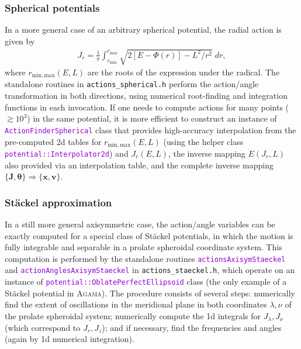 \documentclass[12pt]{article}
\newcommand{\Agama}{\textsc{Agama}\xspace}
\newcommand{\ttt}[1]{\textcolor{darkviolet}{\texttt{#1}}}
\newcommand{\bv}{\boldsymbol{v}}
\newcommand{\bx}{\boldsymbol{x}}
\newcommand{\bJ}{\boldsymbol{J}}
\newcommand{\bt}{\boldsymbol{\theta}}
\begin{document}
\subsubsection{Spherical potentials}  \label{sec:ActionsSpherical}

In a more general case of an arbitrary spherical potential, the radial action is given by 
\begin{align*}
J_r = \frac{1}{\pi} \int_{r_\mathrm{min}}^{r_\mathrm{max}} \sqrt{2[E-\Phi(r)] - L^2/r^2}\;dr,
\end{align*}
where $r_\mathrm{min,max}(E,L)$ are the roots of the expression under the radical.
The standalone routines in \texttt{actions_spherical.h} perform the action/angle transformation in both directions, using numerical root-finding and integration functions in each invocation. If one needs to compute actions for many points ($\gtrsim 10^3$) in the same potential, it is more efficient to construct an instance of \ttt{ActionFinderSpherical} class that provides high-accuracy interpolation from the pre-computed 2d tables for $r_\mathrm{min,max}(E,L)$ (using the helper class \ttt{potential::Interpolator2d}) and $J_r(E,L)$, the inverse mapping $E(J_r,L)$ also provided via an interpolation table, and the complete inverse mapping $\{\bJ,\bt\} \Rightarrow \{\bx,\bv\}$.

\subsubsection{St\"ackel approximation}  \label{sec:ActionsStaeckel}

In a still more general axisymmetric case, the action/angle variables can be exactly computed for a special class of St\"ackel potentials, in which the motion is fully integrable and separable in a prolate spheroidal coordinate system. This computation is performed by the standalone routines \ttt{actionsAxisymStaeckel} and \ttt{actionAnglesAxisymStaeckel} in \mbox{\texttt{actions_staeckel.h}}, which operate on an instance of \ttt{potential::OblatePerfectEllipsoid} class (the only example of a St\"ackel potential in \Agama). The procedure consists of several steps: numerically find the extent of oscillations in the meridional plane in both coordinates $\lambda, \nu$ of the prolate spheroidal system; numerically compute the 1d integrals for $J_\lambda, J_\nu$ (which correspond to $J_r, J_z$); and if necessary, find the frequencies and angles (again by 1d numerical integration).
\end{document}

